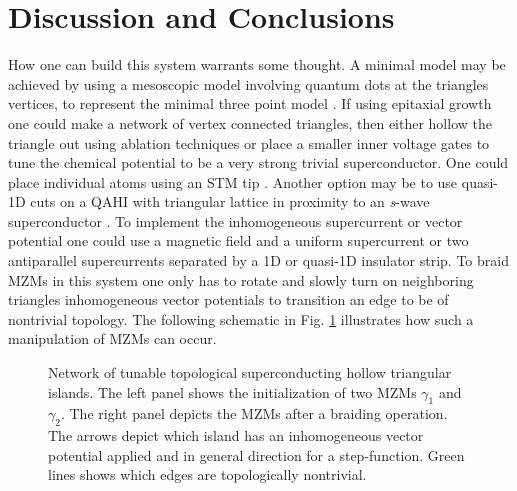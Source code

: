 \documentclass[aps,prb,showpacs,amsmath,amssymb,superscriptaddress]{revtex4-2}
\begin{document}
\section{Discussion and Conclusions}

How one can build this system warrants some thought.
A minimal model may be achieved by using a mesoscopic model involving quantum dots at the triangles vertices, to represent the minimal three point model \cite{dvirRealizationMinimalKitaev2023}.
If using epitaxial growth \cite{pietzschSpinResolvedElectronicStructure2006} one could make a network of vertex connected triangles, then either hollow the triangle out using ablation techniques or place a smaller inner voltage gates to tune the chemical potential to be a very strong trivial superconductor.
One could place individual atoms using an STM tip \cite{schneiderPrecursorsMajoranaModes2022}.
Another option may be to use quasi-1D cuts on a QAHI with triangular lattice in proximity to an \textit{s}-wave superconductor \cite{xieCreatingLocalizedMajorana2021}.
To implement the inhomogeneous supercurrent or vector potential one could use a magnetic field and a uniform supercurrent or two antiparallel supercurrents separated by a 1D or quasi-1D insulator strip.
To braid MZMs in this system one only has to rotate and slowly turn on neighboring triangles inhomogeneous vector potentials to transition an edge to be of nontrivial topology.
The following schematic in Fig. \ref{fig: triangular-network-braiding} illustrates how such a manipulation of MZMs can occur.

\begin{figure}[]
  \caption{Network of tunable topological superconducting hollow triangular islands. The left panel shows the initialization of two MZMs $\gamma_1$ and $\gamma_2$. The right panel depicts the MZMs after a braiding operation. The arrows depict which island has an inhomogeneous vector potential applied and in general direction for a step-function. Green lines shows which edges are topologically nontrivial.}
  \label{fig: triangular-network-braiding}
\end{figure}
\end{document}
